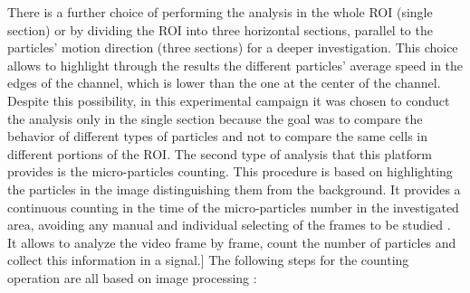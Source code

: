 \documentclass[journal]{IEEEtran}
\theoremstyle{definition}
\theoremstyle{remark}
\begin{document}
There is a further choice of performing the analysis in the whole ROI (single section) or by dividing the ROI into three horizontal sections, parallel to the particles' motion direction (three sections) for a deeper investigation. This choice allows to highlight through the results the different particles' average speed in the edges of the channel, which is lower than the one at the center of the channel.
Despite this possibility, in this experimental campaign it was chosen to conduct the analysis only in the single section because the goal was to compare the behavior of different types of particles and not to compare the same cells in different portions of the ROI.
The second type  of analysis that this platform provides is the micro-particles counting. This procedure is based on highlighting the particles in the image distinguishing them from the background. It provides a continuous counting in the time of the micro-particles number in the investigated area, avoiding any manual and individual selecting of the frames to be studied . It allows to analyze the video frame by frame, count the number of particles and collect this information in a signal.]
The following steps for the counting operation are all based on image processing :
 
\end{document}
